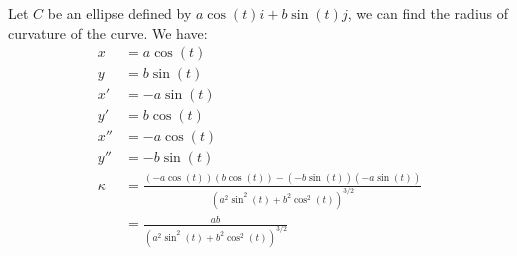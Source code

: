 \documentclass[11pt]{report}
\begin{document}
\begin{example}[Ellipse]
    Let $C$ be an ellipse defined by $a\cos(t)i + b\sin(t)j$, we can find the radius of curvature of the curve. We have:
    \begin{align*}
        x &= a\cos(t) \\
        y &= b\sin(t) \\
        x' &= -a\sin(t) \\
        y' &= b\cos(t) \\
        x'' &= -a\cos(t) \\
        y'' &= -b\sin(t) \\
        \kappa &= \frac{(-a\cos(t))(b\cos(t)) - (-b\sin(t))(-a\sin(t))}{(a^2\sin^2(t) + b^2\cos^2(t))^{3/2}} \\
        &= \frac{ab}{(a^2\sin^2(t) + b^2\cos^2(t))^{3/2}}
    \end{align*}
\end{example}
\end{document}
